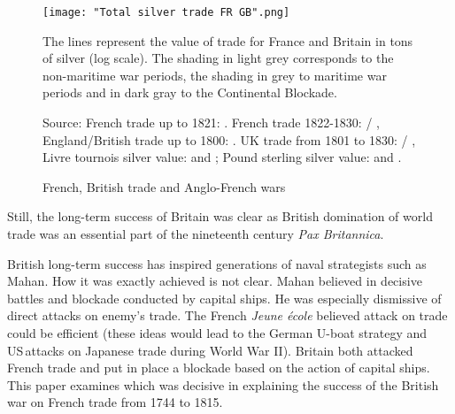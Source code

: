 \documentclass[12pt,a4paper,notitlepage,english]{article}
\newcommand{\fontsmall}{\fontsize{10pt}{12pt}\selectfont}
\newcommand{\source}[1]{\caption*{\footnotesize Source: {#1}} }
\begin{document}
\begin{figure}[h!]
	\caption{French, British trade and Anglo-French wars}\label{FrBritTrade}
	\centering
	\texttt{[image: "Total silver trade FR GB".png]}
	\begin{minipage}{18cm}
		\begin{flushleft}
			\fontsmall
			The lines represent the value of trade for France and Britain in tons of silver (log scale). The shading in light grey corresponds to the non-maritime war periods, the shading in grey to maritime war periods and in dark gray to the Continental Blockade.
			\source{French trade up to 1821: \cite{Daudin2020}. French trade 1822-1830: \cite{Federico2016} / \cite{Dedinger2017},
				England/British trade up to 1800: \cite{Deane1969}. UK trade from 1801 to 1830: \cite{Federico2016} / \cite{Dedinger2017},
				Livre tournois silver value: \cite{Dewailly1857} and \cite{Hoffman2000}; Pound sterling silver value: \cite{Clark2006} and \cite{Jastram1981}. }
		\end{flushleft}
	\end{minipage}
\end{figure}


Still, the long-term success of Britain was clear as British domination of world trade was an essential part of the nineteenth century \emph{Pax Britannica}.

British long-term success has inspired generations of naval strategists such as Mahan.
How it was exactly achieved is not clear.
Mahan believed in decisive battles and blockade conducted by capital ships.
He was especially dismissive of direct attacks on enemy's trade.
The French \textit{Jeune école} believed attack on trade could be efficient \cite{Aube1882} (these ideas would lead to the German U-boat strategy and US attacks on Japanese trade during World War II).
Britain both attacked French trade and put in place a blockade based on the action of capital ships.
This paper examines which was decisive in explaining the success of the British war on French trade from 1744 to 1815.
 
\end{document}
